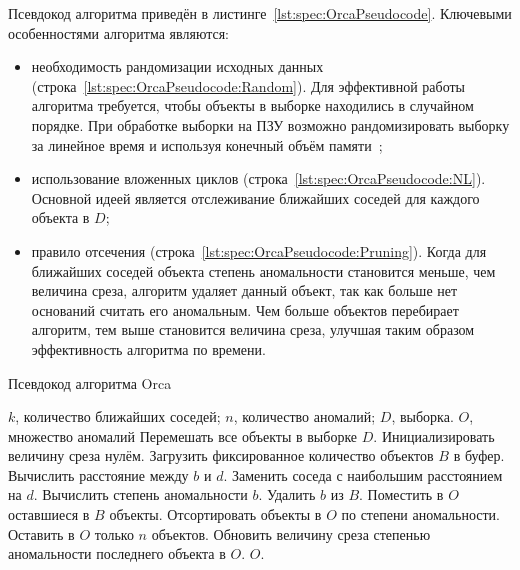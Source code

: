 Псевдокод алгоритма приведён в листинге~\ref{lst:spec:OrcaPseudocode}. Ключевыми особенностями алгоритма являются:
\begin{itemize}
	\item необходимость рандомизации исходных данных (строка~\ref{lst:spec:OrcaPseudocode:Random}). Для эффективной работы алгоритма требуется, чтобы объекты в выборке находились в случайном порядке. При обработке выборки на ПЗУ возможно рандомизировать выборку за линейное время и используя конечный объём памяти~\cite{BaySchwabacherOrca};
	\item использование вложенных циклов (строка~\ref{lst:spec:OrcaPseudocode:NL}). Основной идеей является отслеживание ближайших соседей для каждого объекта в $D$;
	\item правило отсечения (строка~\ref{lst:spec:OrcaPseudocode:Pruning}). Когда для ближайших соседей объекта степень аномальности становится меньше, чем величина среза, алгоритм удаляет данный объект, так как больше нет оснований считать его аномальным. Чем больше объектов перебирает алгоритм, тем выше становится величина среза, улучшая таким образом эффективность алгоритма по времени.
\end{itemize}

\begin{algorithm}[h]
\caption{Псевдокод алгоритма Orca}
\label{lst:spec:OrcaPseudocode}
\begin{algorithmic}[1]
\REQUIRE $k$, количество ближайших соседей; $n$, количество аномалий; $D$, выборка.
\ENSURE $O$, множество аномалий
\STATE Перемешать все объекты в выборке $D$. \label{lst:spec:OrcaPseudocode:Random}
\STATE Инициализировать величину среза нулём.
	\STATE Загрузить фиксированное количество объектов $B$ в буфер.
	 \label{lst:spec:OrcaPseudocode:NL}
			\STATE Вычислить расстояние между $b$ и $d$.
				\STATE Заменить соседа с наибольшим расстоянием на $d$.
				\STATE Вычислить степень аномальности $b$.
				 \label{lst:spec:OrcaPseudocode:Pruning}
					\STATE Удалить $b$ из $B$.
				\ENDIF
			\ENDIF
		\ENDFOR
	\ENDFOR
	\STATE Поместить в $O$ оставшиеся в $B$ объекты.
	\STATE Отсортировать объекты в $O$ по степени аномальности.
	\STATE Оставить в $O$ только $n$ объектов.
	\STATE Обновить величину среза степенью аномальности последнего объекта в $O$.
\ENDWHILE
\RETURN $O$.
\end{algorithmic}
\end{algorithm}

